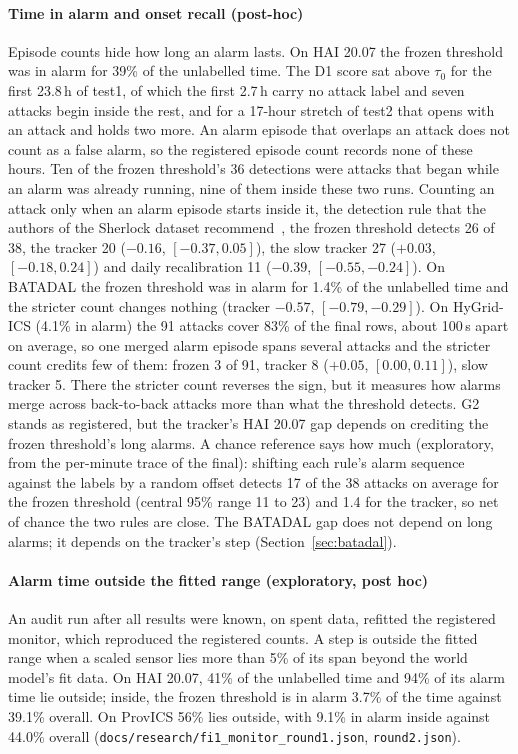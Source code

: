 \documentclass[sigconf]{acmart}
\begin{document}
\paragraph{Time in alarm and onset recall (post-hoc)}
Episode counts hide how long an alarm lasts. On HAI 20.07 the frozen threshold was in alarm for 39\%
of the unlabelled time. The D1 score sat above $\tau_0$ for the first 23.8\,h of test1, of which the
first 2.7\,h carry no attack label and seven attacks begin inside the rest, and for a 17-hour stretch of test2 that opens with an attack and holds two more. An alarm episode that overlaps an attack does not count as a false
alarm, so the registered episode count records none of these hours. Ten of the frozen threshold's 36
detections were attacks that began while an alarm was already running, nine of them inside these two runs. Counting an attack
only when an alarm episode starts inside it, the detection rule that the authors of the Sherlock
dataset recommend~\cite{wagner2025sherlock}, the frozen threshold detects 26 of 38, the tracker 20
($-0.16$, $[-0.37, 0.05]$), the slow tracker 27 ($+0.03$, $[-0.18, 0.24]$) and daily recalibration 11 ($-0.39$, $[-0.55, -0.24]$). On BATADAL the frozen threshold was in alarm for 1.4\% of the unlabelled
time and the stricter count changes nothing (tracker $-0.57$, $[-0.79, -0.29]$). On HyGrid-ICS (4.1\%
in alarm) the 91 attacks cover 83\% of the final rows, about 100\,s apart on average, so one merged
alarm episode spans several attacks and the stricter count credits few of them: frozen 3 of 91,
tracker 8 ($+0.05$, $[0.00, 0.11]$), slow tracker 5. There the stricter count reverses the sign, but
it measures how alarms merge across back-to-back attacks more than what the threshold detects. G2
stands as registered, but the tracker's HAI 20.07 gap depends on crediting the frozen threshold's long
alarms. A chance reference says how much (exploratory, from the per-minute trace of the final): shifting
each rule's alarm sequence against the labels by a random offset detects 17 of the 38 attacks on
average for the frozen threshold (central 95\% range 11 to 23) and 1.4 for the tracker, so net
of chance the two rules are close. The BATADAL gap does not depend on long alarms; it depends on the
tracker's step (Section~\ref{sec:batadal}).

\paragraph{Alarm time outside the fitted range (exploratory, post hoc)}
An audit run after all results were known, on spent data, refitted the registered monitor, which
reproduced the registered counts. A step is outside the fitted range when a scaled sensor lies more
than 5\% of its span beyond the world model's fit data. On HAI 20.07, 41\% of the unlabelled time and
94\% of its alarm time lie outside; inside, the frozen threshold is in alarm 3.7\% of the time against
39.1\% overall. On ProvICS 56\% lies outside, with 9.1\% in alarm inside against 44.0\% overall
(\texttt{docs/research/fi1\_monitor\_round1.json}, \texttt{round2.json}).
\end{document}

